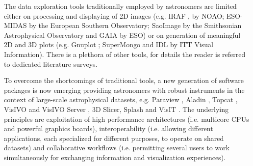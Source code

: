 The data exploration tools traditionally employed by astronomers 
are limited either 
on processing and displaying of 2D images (e.g. IRAF \cite{iraf}, by NOAO; 
ESO-MIDAS \cite{midas} by the European Southern Observatory; SaoImage \cite{sao} 
by the Smithsonian Astrophysical Observatory and GAIA \cite{gaia} by ESO) or on 
generation of meaningful 2D and 3D plots (e.g. Gnuplot \cite{gnuplot}; 
SuperMongo \cite{supermongo} and IDL \cite{idl} by ITT Visual Information). 
There is a plethora of other tools, for details the reader is referred to 
dedicated literature surveys.

To overcome the shortcomings of traditional tools, a new generation of software 
packages is now emerging providing astronomers with robust instruments in the context 
of large-scale astrophysical datasets, e.g. Paraview \cite{paraview}, Aladin \cite{aladin}, 
Topcat \cite{topcat}, VisIVO \cite{visivo1} and VisIVO Server \cite{visivo2}, 
3D Slicer\cite{3dslicer}, Splash \cite{splash} and VisIT \cite{visit}. 
The underlying principles are exploitation of high performance architectures 
(i.e. multicore CPUs and powerful graphics boards), interoperability (i.e. allowing 
different applications, each specialized for different purposes, to operate on 
shared datasets) and collaborative workflows (i.e. permitting several users to 
work simultaneously for exchanging information and visualization experiences).

%

